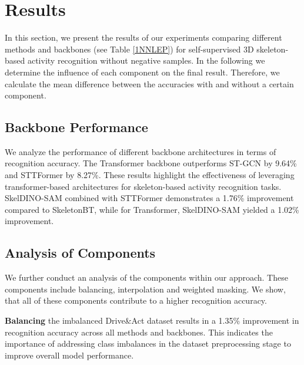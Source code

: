 \section{Results}

In this section, we present the results of our experiments comparing different methods and backbones (see Table \ref{1NNLEP}) for self-supervised 3D skeleton-based activity recognition without negative samples. 
In the following we determine the influence of each component on the final result. Therefore, we calculate the mean difference between the accuracies with and without a certain component.

\subsection{Backbone Performance}

We analyze the performance of different backbone architectures in terms of recognition accuracy. The Transformer backbone outperforms ST-GCN by 9.64\% and STTFormer by 8.27\%. These results highlight the effectiveness of leveraging transformer-based architectures for skeleton-based activity recognition tasks. SkelDINO-SAM combined with STTFormer demonstrates a 1.76\% improvement compared to SkeletonBT, while for Transformer, SkelDINO-SAM yielded a 1.02\% improvement. 

\subsection{Analysis of Components}

We further conduct an analysis of the components within our approach. These components include balancing, interpolation and weighted masking. We show, that all of these components contribute to a higher recognition accuracy. 

\textbf{Balancing} the imbalanced Drive\&Act dataset results in a 1.35\% improvement in recognition accuracy across all methods and backbones. This indicates the importance of addressing class imbalances in the dataset preprocessing stage to improve overall model performance.

